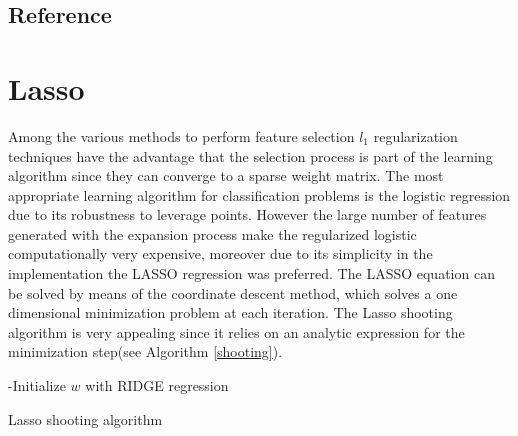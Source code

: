 \documentclass[a4paper, 10pt, conference]{ieeeconf}      %
\begin{document}




\section{Reference}












\appendix
\chapter{Lasso}

Among the various methods to perform feature selection $l_1$ regularization
techniques have the advantage that the selection process is part of the
learning algorithm since they can converge to a sparse weight matrix.  The most
appropriate learning algorithm for classification problems is the logistic
regression due to its robustness to leverage points. However the large number
of features generated with the expansion process make the regularized logistic
computationally very expensive, moreover due to its simplicity in the
implementation the LASSO regression was preferred.  The LASSO equation can be
solved by means of the coordinate descent method, which solves a one
dimensional minimization problem at each iteration. The Lasso shooting
algorithm is very appealing since it relies on an analytic expression for the
minimization step(see Algorithm \ref{shooting}).

\begin{algorithm}[]
 -Initialize $w$ with RIDGE regression \\
 \label{shooting}
 \caption{Lasso shooting algorithm}
\end{algorithm}\\
\end{document}
